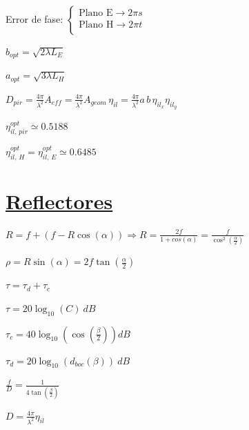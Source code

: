 \documentclass[twocolumn, 8pt]{extarticle}
\begin{document}
\vspace{0.5cm}
Error de fase: \( \left \{
\begin{array}{l}
	\text{Plano E} \rightarrow 2\pi s \\
	\text{Plano H} \rightarrow 2\pi t \\
\end{array}
\right . \)

\vspace{0.5cm}
\( b_{opt} = \sqrt{ 2\lambda L_E } \)

\vspace{0.5cm}
\( a_{opt} = \sqrt{ 3\lambda L_H } \)

\vspace{0.5cm}
\( D_{pir} = \frac{ 4\pi }{ \lambda^2 } A_{eff} = \frac{ 4\pi }{ \lambda^2 } A_{geom} \, \eta_{il} = \frac{ 4\pi }{ \lambda^2 } a \, b \, \eta_{il_x} \eta_{il_y} \)

\vspace{0.5cm}
\( \eta^{opt}_{il ,\, pir} \simeq 0.5188 \)

\vspace{0.5cm}
\( \eta^{opt}_{il ,\, H} =  \eta^{opt}_{il ,\, E} \simeq 0.6485 \)

\vspace{0.5cm}
\section*{\underline{Reflectores}}

\( R = f + (f - R\cos(\alpha)) \Rightarrow R = \frac{2f}{1 + cos(\alpha)} = \frac{f}{\cos^2\left(\frac{\alpha}{2}\right)}\)

\vspace{0.5cm}
\( \rho = R \sin(\alpha) = 2f \tan\left(\frac{\alpha}{2}\right) \)

\vspace{0.5cm}
\( \tau = \tau_d + \tau_c\)

\vspace{0.5cm}
\( \tau = 20\log_{10}(C)\ dB \)

\vspace{0.5cm}
\( \tau_c = 40\log_{10}\left(\cos\left(\frac{\beta}{2}\right)\right) dB \)

\vspace{0.5cm}
\( \tau_d = 20\log_{10}(d_{boc}(\beta))\ dB \)

\vspace{0.5cm}
\( \frac{f}{D} = \frac{1}{4\tan\left(\frac{\beta}{2}\right)} \)

\vspace{0.5cm}
\( D = \frac{4\pi}{\lambda^2} \eta_{il} \)
\end{document}
